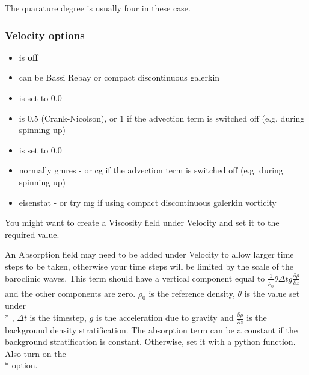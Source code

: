 The quarature degree is usually four in these case.

\subsubsection{Velocity options}

\begin{itemize}
\item {} is \textbf{off}
\item {} can be Bassi Rebay or compact discontinuous galerkin
\item {} is set to $0.0$
\item {} is $0.5$ (Crank-Nicolson), or $1$ if the advection term is switched off (e.g. during spinning up)
\item {} is set to $0.0$
\item {} normally gmres - or cg if the advection term is switched off (e.g. during spinning up)
\item {} eisenstat - or try mg if using compact discontinuous galerkin vorticity
\end{itemize}


You might want to create a Viscosity field under Velocity and set it to the required value. 

An Absorption field may need to be added under Velocity to allow larger time steps to be taken, otherwise your time steps will be limited by the scale of the baroclinic waves.  This term should have a vertical component equal to  ${\frac{1}{\rho_0}} {\theta} {\Delta} {t} {g} {\frac{\partial \rho}{\partial z}}$ and the other components are zero. $\rho_0$ is the reference density, $\theta$ is the value set under \\* , ${\Delta} {t} $ is the timestep, $g$ is the acceleration due to gravity and $\frac{\partial \rho}{\partial z}$ is the background density stratification.  The absorption term can be a constant if the background stratification is constant. Otherwise, set it with a python function.  Also turn on the \\*  option.

